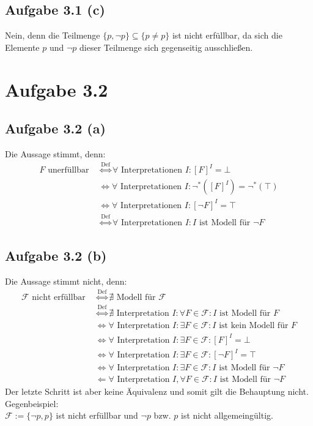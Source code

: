\documentclass[12pt,a4paper]{article}
\newcommand{\F}{\mathcal{F}}
\begin{document}
\subsection*{Aufgabe 3.1 (c)}
Nein, denn die Teilmenge $\lbrace p,\neg p\rbrace \subseteq\lbrace p\neq p\rbrace$ ist nicht erfüllbar, da sich die Elemente $p$ und $\neg p$ dieser Teilmenge sich gegenseitig ausschließen.

\section*{Aufgabe 3.2}
\subsection*{Aufgabe 3.2 (a)}
Die Aussage stimmt, denn:
\begin{align*}
F\text{ unerfüllbar }
&\stackrel{\text{Def}}{\Longleftrightarrow}
\forall\text{ Interpretationen } I:[F]^I=\bot\\
&\stackrel{\text{}}{\Longleftrightarrow}
\forall\text{ Interpretationen } I:\neg^\ast([F]^I)=\neg^\ast(\top)\\
&\stackrel{\text{}}{\Longleftrightarrow}
\forall\text{ Interpretationen } I:[\neg F]^I=\top\\
&\stackrel{\text{Def}}{\Longleftrightarrow}
\forall\text{ Interpretationen } I:I\text{ ist Modell für } \neg F
\end{align*}

\subsection*{Aufgabe 3.2 (b)}
Die Aussage stimmt nicht, denn:
\begin{align*}
\F\text{ nicht erfüllbar }
&\stackrel{\text{Def}}{\Longleftrightarrow}
\nexists\text{ Modell für }\F\\
&\stackrel{\text{Def}}{\Longleftrightarrow}
\nexists\text{ Interpretation }I:\forall F\in\F:I\text{ ist Modell für }F\\
&\stackrel{\text{}}{\Longleftrightarrow}
\forall\text{ Interpretation }I:\exists F\in\F:I\text{ ist kein Modell für } F\\
&\stackrel{\text{}}{\Longleftrightarrow}
\forall\text{ Interpretation }I:\exists F\in\F:[F]^I=\bot\\
&\stackrel{\text{}}{\Longleftrightarrow}
\forall\text{ Interpretation }I:\exists F\in\F:[\neg F]^I=\top\\
&\stackrel{\text{}}{\Longleftrightarrow}
\forall\text{ Interpretation }I:\exists F\in\F:I\text{ ist Modell für }\neg F\\
&\Longleftarrow
\forall\text{ Interpretation } I,\forall F\in\F:I\text{ ist Modell für }\neg F
\end{align*}
Der letzte Schritt ist aber keine Äquivalenz und somit gilt die Behauptung nicht. Gegenbeispiel:\\
$\F:=\lbrace\neg p,p\rbrace$ ist nicht erfüllbar und $\neg p$ bzw. $p$ ist nicht allgemeingültig.
\end{document}

